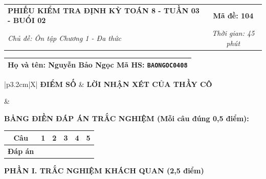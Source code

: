 \documentclass[12pt,a4paper]{article}
\begin{document}
\newpage


\noindent
\begin{tabularx}{\linewidth}{|X|c|}
\hline
\textbf{PHIẾU KIỂM TRA ĐỊNH KỲ TOÁN 8 - TUẦN 03 - BUỔI 02} & \textbf{Mã đề: 104} \\
\textit{Chủ đề: Ôn tập Chương 1 - Đa thức} & \textit{Thời gian: 45 phút} \\
\hline
\end{tabularx}

\vspace{1mm}

\noindent
\begin{tabularx}{\linewidth}{|X|}
\hline
\rule[-2mm]{0pt}{7.5mm}\textbf{Họ và tên:} \textbf{\large Nguyễn Bảo Ngọc} \hfill \textbf{Mã HS:} \texttt{BAONGOC0408} \quad \\
\hline
\end{tabularx}

\vspace{1mm}

\noindent
\begin{tabularx}{\linewidth}{|p{3.2cm}|X|}
\hline
\centering\textbf{ĐIỂM SỐ} & \centering\textbf{LỜI NHẬN XÉT CỦA THẦY CÔ} \tabularnewline
\hline
\rule{0pt}{1.3cm} & \tabularnewline
\hline
\end{tabularx}

\vspace{1.2mm}

\noindent\textbf{BẢNG ĐIỀN ĐÁP ÁN TRẮC NGHIỆM (Mỗi câu đúng 0,5 điểm):}
\vspace{0.8mm}

\noindent
\renewcommand{\arraystretch}{1.35}
\begin{tabularx}{\linewidth}{|c|*{5}{>{\centering\arraybackslash}X|}}
\hline
\textbf{Câu} & \textbf{1} & \textbf{2} & \textbf{3} & \textbf{4} & \textbf{5} \\
\hline
\textbf{Đáp án} & & & & & \\
\hline
\end{tabularx}
\renewcommand{\arraystretch}{1.0}

\vspace{1.5mm}

\noindent\textbf{\large PHẦN I. TRẮC NGHIỆM KHÁCH QUAN (2,5 điểm)}
\vspace{1mm}
\end{document}
